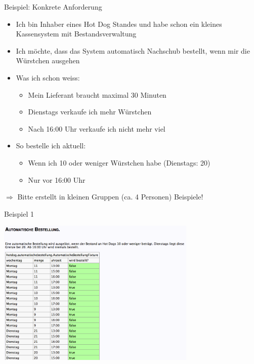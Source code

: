 \begin{frame}{Beispiel: Konkrete Anforderung}

\begin{itemize}
	\item Ich bin Inhaber eines Hot Dog Standes und habe schon ein kleines Kassensystem mit Bestandsverwaltung
	\item Ich möchte, dass das System automatisch Nachschub bestellt, wenn mir die Würstchen ausgehen
	
	\item Was ich schon weiss:
	\begin{itemize}
		\item Mein Lieferant braucht maximal 30 Minuten
		\item Dienstags verkaufe ich mehr Würstchen
		\item Nach 16:00 Uhr verkaufe ich nicht mehr viel
	\end{itemize}
	
	\item So bestelle ich aktuell:
	\begin{itemize}
		\item Wenn ich 10 oder weniger Würstchen habe (Dienstags: 20)
		\item Nur vor 16:00 Uhr
	\end{itemize}
\end{itemize}
	
$\Rightarrow$ Bitte erstellt in kleinen Gruppen (ca. 4 Personen) Beispiele!

\end{frame}


\begin{frame}{Beispiel 1}

\begin{center}
\includegraphics[height=7cm]{SchlechtesBeispiel.png} \newline
\end{center}

\end{frame}

